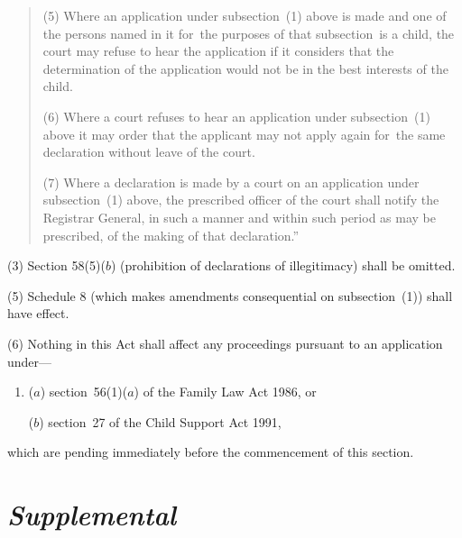 \documentclass[12pt,a4paper]{article}
\begin{document}
\begin{quotation}
(5) Where an application under subsection~(1)  above is made and one of the persons named in it for~the purposes of that subsection~is a child, the court may refuse to hear the application if it considers that the determination of the application would not be in the best interests of the child.

(6) Where a court refuses to hear an application under subsection~(1)  above it may order that the applicant may not apply again for~the same declaration without leave of the court.

(7) Where a declaration is made by a court on an application under subsection~(1)  above, the prescribed officer of the court shall notify the Registrar General, in such a manner and within such period as may be prescribed, of the making of that declaration.”
\end{quotation}

(3) Section 58(5)($b$)  (prohibition of declarations of illegitimacy) shall be omitted.

%
%

(5) Schedule 8 (which makes amendments consequential on subsection~(1)) shall have effect.

(6) Nothing in this Act shall affect any proceedings pursuant to an application under—
\begin{enumerate}\item[]
($a$) section~56(1)($a$)  of the Family Law Act 1986, or

($b$) section~27 of the Child Support Act 1991,
\end{enumerate}
which are pending immediately before the commencement of this section.


\section{\itshape Supplemental}
\end{document}
